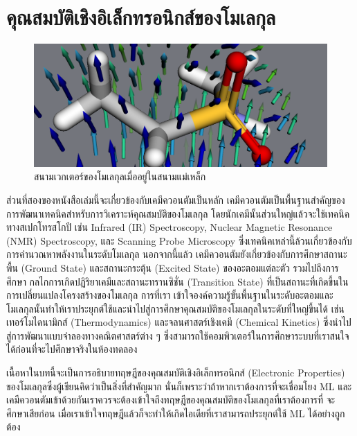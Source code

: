 

\chapter{คุณสมบัติเชิงอิเล็กทรอนิกส์ของโมเลกุล}
\label{ch:el_prop}

\begin{figure}[htbp]
    \centering
    \includegraphics[width=\linewidth]{fig/mol_properties.png}
    \caption{สนามเวกเตอร์ของโมเลกุลเมื่ออยู่ในสนามแม่เหล็ก}
    \label{fig:mol_prop}
\end{figure}

ส่วนที่สองของหนังสือเล่มนี้จะเกี่ยวข้องกับเคมีควอนตัมเป็นหลัก เคมีควอนตัมเป็นพื้นฐานสำคัญของการพัฒนาเทคนิคสำหรับการวิเคราะห์คุณสมบัติของโมเลกุล
โดยนักเคมีนั้นส่วนใหญ่แล้วจะใช้เทคนิคทางสเปกโทรสโกปี เช่น Infrared (IR) Spectroscopy, Nuclear Magnetic Resonance (NMR) 
Spectroscopy, และ Scanning Probe Microscopy ซึ่งเทคนิคเหล่านี้ล้วนเกี่ยวข้องกับการคำนวณหาพลังงานในระดับโมเลกุล นอกจากนี้แล้ว%
เคมีควอนตัมยังเกี่ยวข้องกับการศึกษาสถานะพื้น (Ground State) และสถานะกระตุ้น (Excited State) ของอะตอมแต่ละตัว รวมไปถึงการศึกษา%
กลไกการเกิดปฏิริยาเคมีและสถานะทรานซิชั่น (Transition State) ที่เป็นสถานะที่เกิดขึ้นในการเปลี่ยนแปลงโครงสร้างของโมเลกุล การที่เรา%
เข้าใจองค์ความรู้ขั้นพื้นฐานในระดับอะตอมและโมเลกุลนั้นทำให้เราประยุกต์ใช้และนำไปสู่การศึกษาคุณสมบัติของโมเลกุลในระดับที่ใหญ่ขึ้นได้ เช่น 
เทอร์โมไดนามิกส์ (Thermodynamics) และจลนศาสตร์เชิงเคมี (Chemical Kinetics) ซึ่งนำไปสู่การพัฒนาแบบจำลองทางคณิตศาสตร์ต่าง ๆ 
ซึ่งสามารถใช้คอมพิวเตอร์ในการศึกษาระบบที่เราสนใจได้ก่อนที่จะไปศึกษาจริงในห้องทดลอง

เนื้อหาในบทนี้จะเป็นการอธิบายทฤษฎีของคุณสมบัติเชิงอิเล็กทรอนิกส์ (Electronic Properties) ของโมเลกุลซึ่งผู้เขียนคิดว่าเป็นสิ่งที่สำคัญมาก 
นั่นก็เพราะว่าถ้าหากเราต้องการที่จะเชื่อมโยง ML และเคมีควอนตัมเข้าด้วยกันเราควรจะต้องเข้าใจถึงทฤษฎีของคุณสมบัติของโมเลกุลที่เราต้องการที่%
จะศึกษาเสียก่อน เมื่อเราเข้าใจทฤษฎีแล้วก็จะทำให้เกิดไอเดียที่เราสามารถประยุกต์ใช้ ML ได้อย่างถูกต้อง

